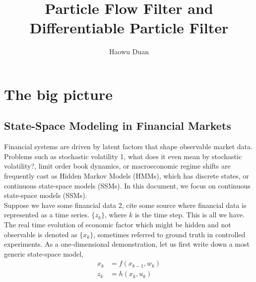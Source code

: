 \documentclass{article}
\begin{document}
\title{Particle Flow Filter and Differentiable Particle Filter}

\author{Haowu Duan}





\maketitle

\tableofcontents


\newpage
\section{The big picture}

\subsection{State-Space Modeling in Financial Markets}
Financial systems are driven by latent factors that shape observable market data. Problems such as stochastic volatility {\color{red}1, what does it even mean by stochastic volatility?}, limit order book dynamics, or macroeconomic regime shifts are frequently cast as Hidden Markov Models (HMMs), which has discrete states, or continuous state-space models (SSMs). In this document, we focus on continuous state-space models (SSMs). \\[10pt]

Suppose we have some financial data {\color{red}2, cite some source where financial data is represented as a time series.} $\{z_k\}$, where $k$ is the time step. This is all we have. The real time evolution of economic factor which might be hidden and not observable is denoted as $\{x_k\}$, sometimes referred to ground truth in controlled experiments. As a one-dimensional demonstration, let us first write down a most generic state-space model,
\begin{equation}
\begin{split} \label{Eq:SSM}
     x_k &= f(x_{k-1}, w_k) \\
     z_k &= h(x_k, u_k)
\end{split}
\end{equation}
\end{document}
